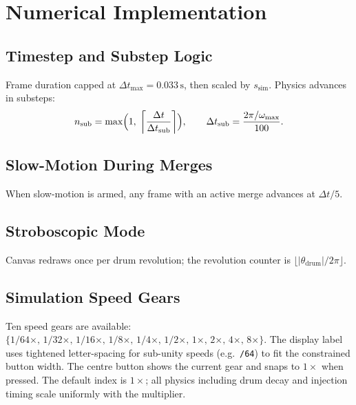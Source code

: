 \documentclass[12pt, a4paper]{article}
\newcommand{\omg}{\omega}
\begin{document}
\section{Numerical Implementation}

\subsection{Timestep and Substep Logic}

Frame duration capped at $\Delta t_{\max} = 0.033\,\mathrm{s}$, then scaled
by $s_{\mathrm{sim}}$. Physics advances in substeps:
\begin{equation}
  n_{\mathrm{sub}} = \max\Bigl(1,\; \left\lceil\frac{\Delta t}{\Delta t_{\mathrm{sub}}}\right\rceil\Bigr),
  \qquad \Delta t_{\mathrm{sub}} = \frac{2\pi/\omg_{\max}}{100}.
\end{equation}

\subsection{Slow-Motion During Merges}

When slow-motion is armed, any frame with an active merge advances at
$\Delta t / 5$.

\subsection{Stroboscopic Mode}

Canvas redraws once per drum revolution; the revolution counter is
$\lfloor |\theta_{\mathrm{drum}}| / 2\pi \rfloor$.

\subsection{Simulation Speed Gears}

Ten speed gears are available:
$\{1/64\times,\, 1/32\times,\, 1/16\times,\, 1/8\times,\, 1/4\times,\,
1/2\times,\, 1\times,\, 2\times,\, 4\times,\, 8\times\}$.
The display label uses tightened letter-spacing for sub-unity speeds
(e.g.\ \texttt{/64}) to fit the constrained button width.
The centre button shows the current gear and snaps to $1\times$ when pressed.
The default index is $1\times$; all physics including drum decay and
injection timing scale uniformly with the multiplier.
\end{document}
